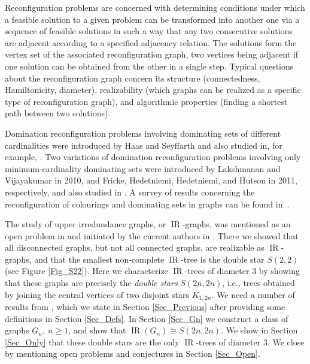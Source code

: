\documentclass[12pt]{article}%
\begin{document}
\label{Sec_Intro}Reconfiguration problems are concerned with determining
conditions under which a feasible solution to a given problem can be
transformed into another one via a sequence of feasible solutions in such a
way that any two consecutive solutions are adjacent according to a specified
adjacency relation. The solutions form the vertex set of the associated
reconfiguration graph, two vertices being adjacent if one solution can be
obtained from the other in a single step. Typical questions about the
reconfiguration graph concern its structure (connectedness, Hamiltonicity,
diameter), realizability (which graphs can be realized as a specific type of
reconfiguration graph), and algorithmic properties (finding a shortest path
between two solutions).

Domination reconfiguration problems involving dominating sets of different
cardinalities were introduced by Haas and Seyffarth \cite{HS1} and also
studied in, for example, \cite{davood, HS2, haddadan-2015, MRT}. Two
variations of domination reconfiguration problems involving only
minimum-cardinality dominating sets were introduced by Lakshmanan and
Vijayakumar \cite{Laksh} in 2010, and Fricke, Hedetniemi, Hedetniemi, and
Hutson \cite{FHHH11} in 2011, respectively, and also studied in \cite{Bien,
CHH10, Dyck, EdThesis, Laksh, Laura1, Amu, SS08, SMN}. A survey of results
concerning the reconfiguration of colourings and dominating sets in graphs can
be found in~\cite{MN}.

The study of upper irredundance graphs, or $\operatorname{IR}$-graphs, was
mentioned as an open problem in \cite{Laura1} and initiated by the current
authors in \cite{mynhardt19}. There we showed that all disconnected graphs,
but not all connected graphs, are realizable as $\operatorname{IR}$-graphs,
and that the smallest non-complete $\operatorname{IR}$-tree is the double star
$S(2,2)$ (see Figure \ref{Fig_S22}). Here we characterize $\operatorname{IR}%
$-trees of diameter $3$ by showing that these graphs are precisely the
\emph{double stars} $S(2n,2n)$, i.e., trees obtained by joining the central
vertices of two disjoint stars $K_{1,2n}$. We need a number of results from
\cite{mynhardt19}, which we state in Section \ref{Sec_Previous} after
providing some definitions in Section \ref{Sec_Defs}. In Section \ref{Sec_Gn}
we construct a class of graphs $G_{n},\ n\geq1$, and show that
$\operatorname{IR}(G_{n})\cong S(2n,2n)$. We show in Section \ref{Sec_Only}
that these double stars are the only $\operatorname{IR}$-trees of diameter
$3$. We close by mentioning open problems and conjectures in Section
\ref{Sec_Open}.
\end{document}
